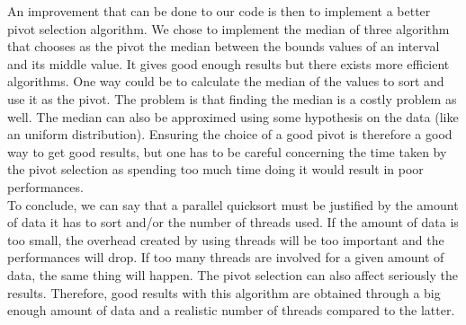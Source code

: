 An improvement that can be done to our code is then to implement a better pivot selection algorithm. We chose to implement the median of three algorithm that chooses as the pivot the median between the bounds values of an interval and its middle value. It gives good enough results but there exists more efficient algorithms. One way could be to calculate the median of the values to sort and use it as the pivot. The problem is that finding the median is a costly problem as well. The median can also be approximed using some hypothesis on the data (like an uniform distribution). Ensuring the choice of a good pivot is therefore a good way to get good results, but one has to be careful concerning the time taken by the pivot selection as spending too much time doing it would result in poor performances.\\

To conclude, we can say that a parallel quicksort must be justified by the amount of data it has to sort and/or the number of threads used. If the amount of data is too small, the overhead created by using threads will be too important and the performances will drop. If too many threads are involved for a given amount of data, the same thing will happen. The pivot selection can also affect seriously the results. Therefore, good results with this algorithm are obtained through a big enough amount of data and a realistic number of threads compared to the latter.\\
